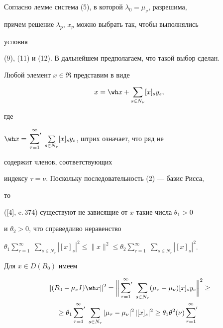 \begin{pf} 


Согласно леммe система (5), в которой $\lambda_0=\mu_\nu$, разрешима, 


причем решение $\lambda_p$, $x_p$ можно выбрать так, чтобы выполнялись 


условия 


(9), (11) и (12). В дальнейшем предполагаем, что такой выбор сделан. 


Любой элемент $x\in\Re$ представим в виде 


\begin{equation} 


x=\wh x+\sum_{s\in N_\nu}[x]_s y_s, 


\end{equation} 


где 


$\wh x=\sideset{}{'}\sum\limits^\infty_{\tau=1}\; 


\sum\limits_{s\in N_\tau}[x]_s y_s$, штрих означает, что ряд не 


содержит членов, соответствующих 


индексу $\tau=\nu$. Поскольку последовательность (2) --- базис Рисса, 


то 


([4], c.\,374) существуют не зависящие от $x$ такие числа $\theta_1>0$ 


и $\theta_2>0$, что справедливо неравенство 


$\theta_1\sum\limits^\infty_{\tau=1}\; 


\sum\limits_{s\in N_\tau}|[x]_s|^2\le\|x\|^2\le\theta_2 


\sum\limits^\infty_{\tau=1}\;\sum\limits_{s\in N_\tau} 


|[x]_s|^2$. 


Для $x\in D(B_0)$ имеем 


\begin{multline*} 


\|(B_0-\mu_\nu I)\wh x\|^2=\bigg\|\sideset{}{'} 


\sum^\infty_{\tau=1}\;\sum_{s\in N_\tau}(\mu_\tau-\mu_\nu) 


[x]_s y_s\bigg\|^2\ge \\ 


\ge \theta_1\sideset{}{'}\sum^\infty_{\tau=1}\; 


\sum_{s\in N_\tau}|\mu_\tau-\mu_\nu|^2\,|[x]_s|^2\ge 


\theta_1\theta^2(\nu)\sideset{}{'}\sum^\infty_{\tau=1}\; 



\end{multline*}
\end{pf}

